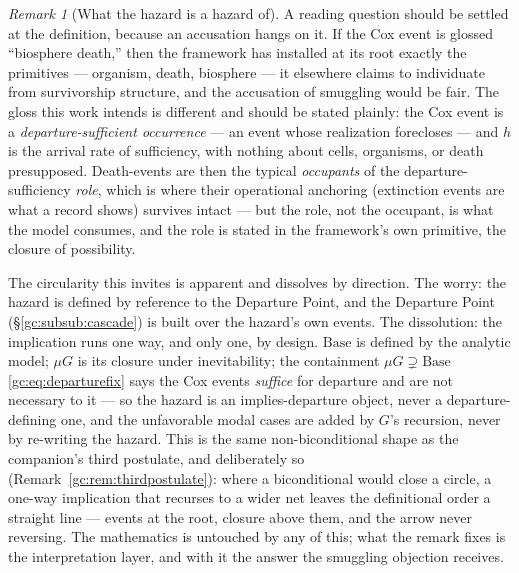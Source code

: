 \documentclass[11pt]{article}
\numberwithin{equation}{section}
\theoremstyle{plain}
\theoremstyle{definition}
\theoremstyle{remark}
\newtheorem{remark}[theorem]{Remark}
\begin{document}
\begin{remark}[What the hazard is a hazard of]\label{gr1:rem:hazardof}
A reading question should be settled at the definition, because an
accusation hangs on it. If the Cox event is glossed ``biosphere
death,'' then the framework has installed at its root exactly the
primitives --- organism, death, biosphere --- it elsewhere claims to
individuate from survivorship structure, and the accusation of
smuggling would be fair. The gloss this work intends is different and
should be stated plainly: the Cox event is a \emph{departure-sufficient
occurrence} --- an event whose realization forecloses --- and $h$ is
the arrival rate of sufficiency, with nothing about cells, organisms,
or death presupposed. Death-events are then the typical
\emph{occupants} of the departure-sufficiency \emph{role}, which is
where their operational anchoring (extinction events are what a record
shows) survives intact --- but the role, not the occupant, is what the
model consumes, and the role is stated in the framework's own
primitive, the closure of possibility.

The circularity this invites is apparent and dissolves by direction.
The worry: the hazard is defined by reference to the Departure Point,
and the Departure Point (\S\ref{gc:subsub:cascade}) is built over the
hazard's own events. The dissolution: the implication runs one way,
and only one, by design. $\mathrm{Base}$ is defined by the analytic
model; $\mu G$ is its closure under inevitability; the containment
$\mu G\supsetneq\mathrm{Base}$ \eqref{gc:eq:departurefix} says the
Cox events \emph{suffice} for departure and are not necessary to it
--- so the hazard is an implies-departure object, never a
departure-defining one, and the unfavorable modal cases are added by
$G$'s recursion, never by re-writing the hazard. This is the same
non-biconditional shape as the companion's third postulate, and
deliberately so (Remark~\ref{gc:rem:thirdpostulate}): where a
biconditional would close a circle, a one-way implication that
recurses to a wider net leaves the definitional order a straight line
--- events at the root, closure above them, and the arrow never
reversing. The mathematics is untouched by any of this; what the
remark fixes is the interpretation layer, and with it the answer the
smuggling objection receives.
\end{remark}
\end{document}
